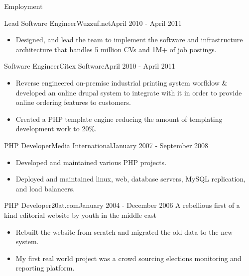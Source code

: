 \documentclass[]{mosabcv}
\begin{document}
\begin{cvsection}{Employment}
		\begin{cvsubsection}{Lead Software Engineer}{Wuzzuf.net}{April 2010 - April 2011}			
			\begin{itemize}
				\item Designed, and lead the team to implement the software and infrastructure architecture that handles 5 million CVs and 1M+ of job postings.
			\end{itemize}
		\end{cvsubsection}
	
		\begin{cvsubsection}{Software Engineer}{Citex Software}{April 2010 - April 2011}
			\begin{itemize}
				\item Reverse engineered on-premise industrial printing system worfklow \& developed an online drupal system to integrate with it in order to provide online ordering features to customers.
				\item Created a PHP template engine reducing the amount of templating development work to 20\%.
			\end{itemize}
		\end{cvsubsection}
		
		\begin{cvsubsection}{PHP Developer}{Media International}{January 2007 - September 2008}
			\begin{itemize}
				\item Developed and maintained various PHP projects.
                \item Deployed and maintained linux, web, database servers, MySQL replication, and load balancers.
			\end{itemize}
		\end{cvsubsection}
		
		\begin{cvsubsection}{PHP Developer}{20at.com}{January 2004 - December 2006}
			A rebellious first of a kind editorial website by youth in the middle east
			\begin{itemize}
				\item Rebuilt the website from scratch and migrated the old data to the new system.
				\item My first real world project was a crowd sourcing elections monitoring and reporting platform.
			\end{itemize}
		\end{cvsubsection}
		
	\end{cvsection}
	
\end{document}
